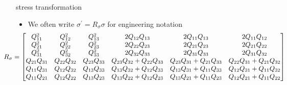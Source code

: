 \documentclass[
  letterpaper,
  ignorenonframetext,
  aspectratio=43,
  handout,
  12pt]{beamer}
\providecommand{\tightlist}{%
  \setlength{\itemsep}{0pt}\setlength{\parskip}{0pt}}
\providecommand{\tightlist}{%
\setlength{\itemsep}{0pt}\setlength{\parskip}{0pt}}
\begin{document}
\begin{frame}{stress transformation}
\protect\hypertarget{stress-transformation-2}{}
\begin{itemize}
\tightlist
\item
  We often write \(\sigma^\prime = R_\sigma \sigma\) for engineering
  notation
  \[\hspace{-.5in} 
		\resizebox{1.2\hsize}{!}{$\displaystyle
			R_\sigma = \begin{bmatrix}
    Q_{11}^2 & Q_{12}^2 & Q_{13}^2 & 2Q_{12}Q_{13} & 2 Q_{11} Q_{13} & 2Q_{11}Q_{12}\\
    Q_{21}^2 & Q_{22}^2 & Q_{23}^2 & 2Q_{22}Q_{23} & 2 Q_{21} Q_{23} & 2Q_{21}Q_{22}\\
    Q_{31}^2 & Q_{32}^2 & Q_{33}^2 & 2Q_{32}Q_{33} & 2 Q_{31} Q_{33} & 2Q_{31}Q_{32}\\
    Q_{21}Q_{31} & Q_{22}Q_{32} & Q_{23}Q_{33} & Q_{23}Q_{32} + Q_{22}Q_{33} & Q_{23}Q_{31} + Q_{21}Q_{33} & Q_{22}Q_{31} + Q_{21}Q_{32}\\
    Q_{11}Q_{31} & Q_{12}Q_{32} & Q_{13}Q_{33} & Q_{13}Q_{32} + Q_{12}Q_{33} & Q_{13}Q_{31} + Q_{11}Q_{33} & Q_{12}Q_{31} + Q_{11}Q_{32}\\
    Q_{11}Q_{21} & Q_{12}Q_{22} & Q_{13}Q_{23} & Q_{13}Q_{22} + Q_{12}Q_{23} & Q_{13}Q_{21} + Q_{11}Q_{23} & Q_{12}Q_{21} + Q_{11}Q_{22}
  \end{bmatrix}
	$}
\]
\end{itemize}
\end{frame}
\end{document}
